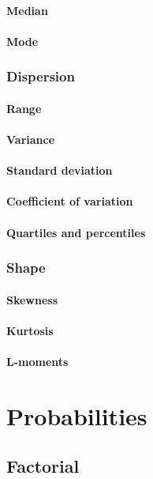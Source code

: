 \documentclass{report}
\begin{document}
	\subsubsection{Median}
	\subsubsection{Mode}
	\subsection{Dispersion}
	\subsubsection{Range}
	\subsubsection{Variance}
	\subsubsection{Standard deviation}
	\subsubsection{Coefficient of variation}
	\subsubsection{Quartiles and percentiles}
	\subsection{Shape}
	\subsubsection{Skewness}
	\subsubsection{Kurtosis}
	\subsubsection{L-moments}

\chapter{Probabilities}
	\section{Factorial}
\end{document}

